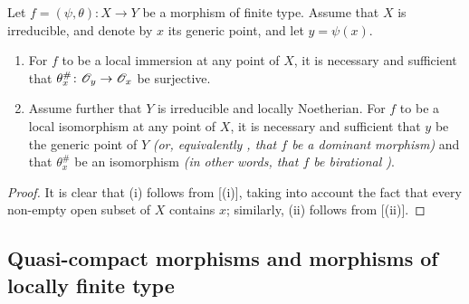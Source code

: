 \begin{cor}[6.5.5]
\label{1.6.5.5}
Let $f=(\psi,\theta)\colon X\to Y$ be a morphism of finite type.
Assume that $X$ is irreducible, and denote by $x$ its generic point, and let $y=\psi(x)$.
\begin{enumerate}[label=\rm(\roman*)]
    \item For $f$ to be a local immersion at any point of $X$, it is necessary and sufficient that $\theta_x^\#\colon\mathscr{O}_y\to\mathscr{O}_x$ be surjective.
    \item Assume further that $Y$ is irreducible and locally Noetherian.
    For $f$ to be a local isomorphism at any point of $X$, it is necessary and sufficient that $y$ be the generic point of $Y$ \emph{(or, equivalently , that $f$ be a \emph{dominant} morphism)} and that $\theta_x^\#$ be an isomorphism \emph{(in other words, that $f$ be \emph{birational} )}.
\end{enumerate}
\end{cor}

\begin{proof}
\label{proof-1.6.5.5}
It is clear that (i) follows from [(i)], taking into account the fact that every non-empty open subset of $X$ contains $x$;
similarly, (ii) follows from [(ii)].
\end{proof}

\subsection{Quasi-compact morphisms and morphisms of locally finite type}
\label{subsection-quasi-compact-morphisms-and-morphisms-of-locally-finite-type}
